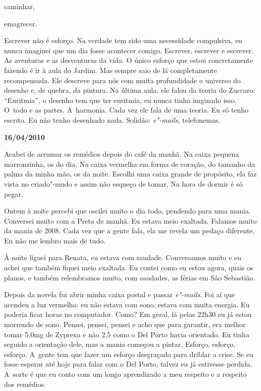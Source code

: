 caminhar,

emagrecer.

Escrever não é esforço. Na verdade tem sido uma necessidade compulsiva,
eu nunca imaginei que um dia fosse acontecer comigo. Escrever, escrever
e escrever. As aventuras e as desventuras da vida. O único esforço que
estou concretamente fazendo é ir à aula do Jardim. Mas sempre saio de lá
completamente recompensada. Ele descreve para nós com muita profundidade
o universo do desenho e, de quebra, da pintura. Na última aula, ele
falou da teoria do Zuccaro: ``Euritmia'', o desenho tem que ter
euritmia, eu nunca tinha imginado isso. O~todo e as partes. A~harmonia.
Cada vez ele fala de uma teoria. Eu só tenho escrito. Eu não tenho
desenhado nada. Solidão: \emph{e"-mails}, telefonemas.

\begin{center}\asterisc{}\end{center}
 \begin{flushright}\textbf{16/04/2010}\end{flushright}


Acabei de arrumar os remédios depois do café da manhã. Na caixa pequena
marronzinha, os do dia. Na caixa vermelha em forma de coração, do
tamanho da palma da minha mão, os da noite. Escolhi uma caixa grande de
propósito, ela faz vista no criado"-mudo e assim não esqueço de tomar. Na
hora de dormir é só pegar.

Ontem à noite percebi que oscilei muito o dia todo, pendendo para uma
mania. Conversei muito com a Preta de manhã. Eu estava meio exaltada.
Falamos muito da mania de 2008. Cada vez que a gente fala, ela me revela
um pedaço diferente. Eu não me lembro mais de tudo.

À noite liguei para Renata, eu estava com saudade. Conversamos muito e
eu achei que também fiquei meio exaltada. Eu contei como eu estou agora,
quais os planos, e também relembramos muito, com saudades, as férias em
São Sebastião.

Depois da novela fui abrir minha caixa postal e passar \emph{e"-mails}.
Foi aí que acendeu a luz vermelha: eu não estava com sono, estava com
muita energia. Eu poderia ficar horas no computador. Como? Em geral,
lá pelas 22h30 eu já estou morrendo de sono. Pensei, pensei, pensei e
acho que para garantir, era melhor tomar 5,0mg de Zyprexa e não 2,5 como
o Del Porto havia orientado. Eu tinha seguido a orientação dele, mas a
mania começou a pintar. Esforço, esforço, esforço. A~gente tem que fazer
um esforço desgraçado para driblar a crise. Se eu fosse esperar até hoje
para falar com o Del Porto, talvez eu já estivesse perdida. A~sorte é
que eu conto com um longo aprendizado a meu respeito e a respeito dos
remédios.

